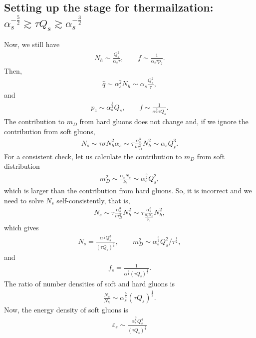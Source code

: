\documentclass[onecolumn,showpacs,nobibnotes,nofootinbib,12pt]{revtex4-1}
\begin{document}
\subsection{Setting up the stage for thermailzation: $\alpha_s^{-\frac{5}{2}}\gtrsim \tau Q_s \gtrsim \alpha_s^{-\frac{3}{2}}$}
Now, we still have
\begin{align}
N_h\sim \frac{Q_s^2}{\alpha_s\tau},\qquad f\sim\frac{1}{\alpha_s\tau p_z}.
\end{align}
Then,
\begin{align}
\hat{q}\sim \alpha_s^2 N_h\sim \alpha_s\frac{Q_s^2}{\tau},
\end{align}
and
\begin{align}
  p_z\sim \alpha_s^\frac{1}{2} Q_s,\qquad f\sim \frac{1}{\alpha^\frac{3}{2}\tau Q_s}.
\end{align}
The contribution to $m_D$ from hard gluons does not change and, if we ignore the contribution from soft gluons, 
\begin{eqnarray}
N_s\sim \tau \sigma N_h^2 \alpha_s \sim \tau \frac{\alpha_s^3}{m_D^2} N_h^2\sim \alpha_s Q_s^3.
\end{eqnarray}
For a consistent check, let us calculate the contribution to $m_D$ from soft distribution
\begin{align}
  m_D^2\sim \frac{\alpha_s N_s}{k_s}\sim \alpha_s^\frac{3}{2} Q_s^2,
\end{align}
which is larger than the contribution from hard gluons. So, it is incorrect and we need to solve $N_s$ self-consistently, that is,
\begin{eqnarray}
N_s\sim \tau \frac{\alpha_s^3}{m_D^2} N_h^2 \sim \tau\frac{\alpha_s^3}{\frac{\alpha_s N_s}{p_z}} N_h^2,
\end{eqnarray}
which gives
\begin{align}
  N_s= \frac{\alpha^{\frac{1}{4}}Q_s^3}{(\tau Q_s)^{\frac{1}{2}}}, \qquad m_D^2\sim \alpha_s^\frac{3}{4} Q_s^2/\tau^{\frac{1}{2}},
\end{align}
and
\begin{align}
  f_s= \frac{1}{\alpha^{\frac{5}{4}}(\tau Q_s)^{\frac{1}{2}}}.
\end{align}
The ratio of number densities of soft and hard gluons is
\begin{align}
  \frac{N_s}{N_h}\sim \alpha_s^{\frac{5}{4}} (\tau Q_s)^{\frac{1}{2}}.
\end{align}
Now, the energy density of soft gluons is
\begin{align}
  \varepsilon_s\sim \frac{\alpha_s^{\frac{3}{4}}Q_s^4}{(\tau Q_s)^{\frac{1}{2}}}
\end{align}
\end{document}
